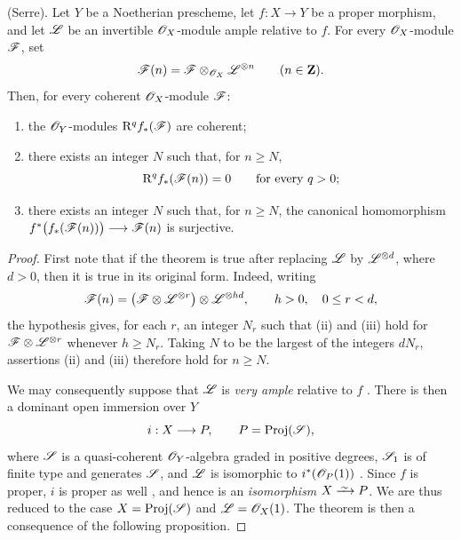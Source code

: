 \begin{theorem}[2.2.1]
\label{III.2.2.1}
(Serre).
Let $Y$ be a Noetherian prescheme, let $f:X\to Y$ be a proper morphism, and let $\mathscr{L}$ be an invertible $\mathscr{O}_X$-module ample relative to $f$.
For every $\mathscr{O}_X$-module $\mathscr{F}$, set
\[
  \mathscr{F}(n)=\mathscr{F}\otimes_{\mathscr{O}_X}\mathscr{L}^{\otimes n}
  \qquad(n\in\mathbf{Z}).
\]
Then, for every coherent $\mathscr{O}_X$-module $\mathscr{F}$:
\begin{enumerate}
  \item[{\rm(i)}] the $\mathscr{O}_Y$-modules $\mathrm{R}^qf_*(\mathscr{F})$ are coherent;
  \item[{\rm(ii)}] there exists an integer $N$ such that, for $n\geq N$,
  \[
    \mathrm{R}^qf_*(\mathscr{F}(n))=0
    \qquad\text{for every }q>0;
  \]
  \item[{\rm(iii)}] there exists an integer $N$ such that, for $n\geq N$, the canonical homomorphism $f^*\bigl(f_*(\mathscr{F}(n))\bigr)\longrightarrow\mathscr{F}(n)$
  is surjective.
\end{enumerate}
\end{theorem}

\begin{proof}
First note that if the theorem is true after replacing $\mathscr{L}$ by $\mathscr{L}^{\otimes d}$, where $d>0$, then it is true in its original form.
Indeed, writing
\[
  \mathscr{F}(n)
  =\bigl(\mathscr{F}\otimes\mathscr{L}^{\otimes r}\bigr)
   \otimes\mathscr{L}^{\otimes hd},
   \qquad h>0,\quad 0\leq r<d,
\]
the hypothesis gives, for each $r$, an integer $N_r$ such that (ii) and (iii) hold for $\mathscr{F}\otimes\mathscr{L}^{\otimes r}$ whenever $h\geq N_r$.
Taking $N$ to be the largest of the integers $dN_r$, assertions (ii) and (iii) therefore hold for $n\geq N$.

We may consequently suppose that $\mathscr{L}$ is \emph{very ample} relative to $f$ .
There is then a dominant open immersion over $Y$
\[
  i:X\longrightarrow P,
  \qquad P=\operatorname{Proj}(\mathscr{S}),
\]
where $\mathscr{S}$ is a quasi-coherent $\mathscr{O}_Y$-algebra graded in positive degrees, $\mathscr{S}_1$ is of finite type and generates $\mathscr{S}$, and $\mathscr{L}$ is isomorphic to $i^*(\mathscr{O}_P(1))$ .
Since $f$ is proper, $i$ is proper as well , and hence is an \emph{isomorphism} $X\simto P$.
We are thus reduced to the case $X=\operatorname{Proj}(\mathscr{S})$ and $\mathscr{L}=\mathscr{O}_X(1)$.
The theorem is then a consequence of the following proposition.
\end{proof}

